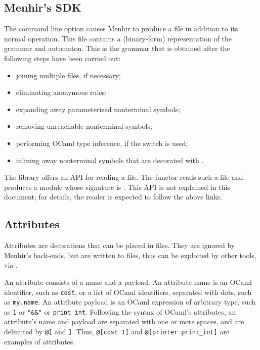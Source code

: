 \documentclass[onecolumn,11pt,nocopyrightspace,preprint]{sigplanconf}
\begin{document}
\subsection{Menhir's SDK}
\label{sec:sdk}

The command line option \ocmly causes Menhir to produce a \cmly file in
addition to its normal operation. This file contains a (binary-form)
representation of the grammar and automaton. This is the grammar that
is obtained after the following steps have been carried out:
\begin{itemize}
\item joining multiple \mly files, if necessary; %
\item eliminating anonymous rules;
\item expanding away parameterized nonterminal symbols;
\item removing unreachable nonterminal symbols;
\item performing OCaml type inference, if the \oinfer switch is used;
\item inlining away nonterminal symbols that are decorated with \dinline.
\end{itemize}

The library \menhirsdk offers an API for reading a \cmly file.
The functor 
reads such a file and produces a module whose signature is
.
This API is not explained in this document; for details,
the reader is expected to follow the above links.


\subsection{Attributes}
\label{sec:attributes}

Attributes are decorations that can be placed in \mly files.
They are ignored by Menhir's back-ends,
but are written to \cmly files,
thus can be exploited by other tools, via \menhirsdk.

An attribute consists of a name and a payload. An attribute name is an OCaml
identifier, such as \texttt{cost}, or a list of OCaml identifiers, separated
with dots, such as \texttt{my.name}. An attribute payload is an OCaml
expression of arbitrary type, such as \texttt{1} or \verb+"&&"+ or \verb+print_int+.
Following the syntax of OCaml's attributes, an attribute's name and payload
are separated with one or more spaces, and are delimited by \verb+@[+ and
\verb+]+. Thus, \verb+@[cost 1]+ and \verb+@[printer print_int]+ are examples
of attributes.
\end{document}
